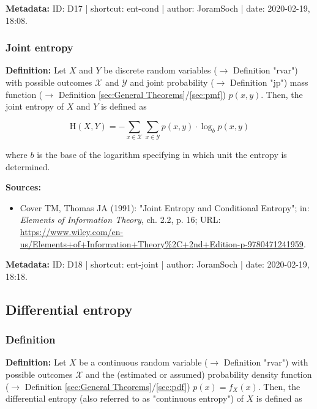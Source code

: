 \documentclass[a4paper,12pt]{book}
\begin{document}
\vspace{1em}
\textbf{Metadata:} ID: D17 | shortcut: ent-cond | author: JoramSoch | date: 2020-02-19, 18:08.


\subsubsection[\textit{Joint entropy}]{Joint entropy} \label{sec:ent-joint}

\vspace{1em}
\textbf{Definition:} Let $X$ and $Y$ be discrete random variables ($\rightarrow$ Definition "rvar") with possible outcomes $\mathcal{X}$ and $\mathcal{Y}$ and joint probability ($\rightarrow$ Definition "jp") mass function ($\rightarrow$ Definition \ref{sec:General Theorems}/\ref{sec:pmf}) $p(x,y)$. Then, the joint entropy of $X$ and $Y$ is defined as

\begin{equation} \label{eq:ent-joint-ent-joint}
\mathrm{H}(X,Y) = - \sum_{x \in \mathcal{X}} \sum_{x \in \mathcal{Y}} p(x,y) \cdot \log_b p(x,y)
\end{equation}

where $b$ is the base of the logarithm specifying in which unit the entropy is determined.

\vspace{1em}
\textbf{Sources:}
\begin{itemize}
\item Cover TM, Thomas JA (1991): "Joint Entropy and Conditional Entropy"; in: \textit{Elements of Information Theory}, ch. 2.2, p. 16; URL: \url{https://www.wiley.com/en-us/Elements+of+Information+Theory%2C+2nd+Edition-p-9780471241959}.
\end{itemize}


\vspace{1em}
\textbf{Metadata:} ID: D18 | shortcut: ent-joint | author: JoramSoch | date: 2020-02-19, 18:18.


\subsection{Differential entropy}

\subsubsection[\textit{Definition}]{Definition} \label{sec:dent}

\vspace{1em}
\textbf{Definition:} Let $X$ be a continuous random variable ($\rightarrow$ Definition "rvar") with possible outcomes $\mathcal{X}$ and the (estimated or assumed) probability density function ($\rightarrow$ Definition \ref{sec:General Theorems}/\ref{sec:pdf}) $p(x) = f_X(x)$. Then, the differential entropy (also referred to as "continuous entropy") of $X$ is defined as
\end{document}
